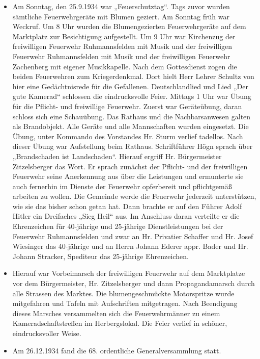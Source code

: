 \documentclass[12pt,a4paper]{book}
\begin{document}
\begin{itemize}
\item Am Sonntag, den 25.9.1934 war „Feuerschutztag“. Tags zuvor wurden
sämtliche Feuerwehrgeräte mit Blumen geziert. Am Sonntag früh war Weckruf. Um 8
Uhr wurden die Blumengezierten Feuerwehrgeräte auf dem Marktplatz zur
Besichtigung aufgestellt. Um 9 Uhr war Kirchenzug der freiwilligen Feuerwehr
Ruhmannsfelden mit Musik und der freiwilligen Feuerwehr Ruhmannsfelden mit Musik
und der freiwilligen Feuerwehr Zachenberg mit eigener Musikkapelle. Nach dem
Gottesdienst zogen die beiden Feuerwehren zum Kriegerdenkmal. Dort hielt Herr
Lehrer Schultz von hier eine Gedächtnisrede für die Gefallenen. Deutschlandlied
und Lied „Der gute Kamerad“ schlossen die eindrucksvolle Feier. Mittags 1 Uhr
war Übung für die Pflicht- und freiwillige Feuerwehr. Zuerst war Geräteübung,
daran schloss sich eine Schauübung. Das Rathaus und die Nachbarsanwesen galten
als Brandobjekt. Alle Geräte und alle Mannschaften wurden eingesetzt. Die Übung,
unter Kommando des Vorstandes Hr. Sturm verlief tadellos. Nach dieser Übung war
Aufstellung beim Rathaus. Schriftführer Högn sprach über „Brandschaden ist
Landschaden“. Hierauf ergriff Hr. Bürgermeister Zitzelsberger das Wort. Er
sprach zunächst der Pflicht- und der freiwilligen Feuerwehr seine Anerkennung
aus über die Leistungen und ermunterte sie auch fernerhin im Dienste der
Feuerwehr opferbereit und pflichtgemäß arbeiten zu wollen. Die Gemeinde werde
die Feuerwehr jederzeit unterstützen, wie sie das bisher schon getan hat. Dann
brachte er auf den Führer Adolf Hitler ein Dreifaches „Sieg Heil“ aus. Im
Anschluss daran verteilte er die Ehrenzeichen für 40-jährige und 25-jährige
Dienstleistungen bei der Feuerwehr Ruhmannsfelden und zwar an Hr. Privatier
Schaffer und Hr. Josef Wiesinger das 40-jährige und an Herrn Johann Ederer appr.
Bader und Hr. Johann Stracker, Spediteur das 25-jährige Ehrenzeichen.

\item Hierauf war Vorbeimarsch der freiwilligen Feuerwehr auf dem Marktplatze
vor dem Bürgermeister, Hr. Zitzelsberger und dann Propagandamarsch durch alle
Strassen des Marktes. Die blumengeschmückte Motorspritze wurde mitgefahren und
Tafeln mit Aufschriften mitgetragen. Nach Beendigung dieses Marsches
versammelten sich die Feuerwehrmänner zu einem Kameradschaftstreffen im
Herbergslokal. Die Feier verlief in schöner, eindrucksvoller Weise.

\item Am 26.12.1934 fand die 68. ordentliche Generalversammlung statt.
\end{itemize}
\end{document}
